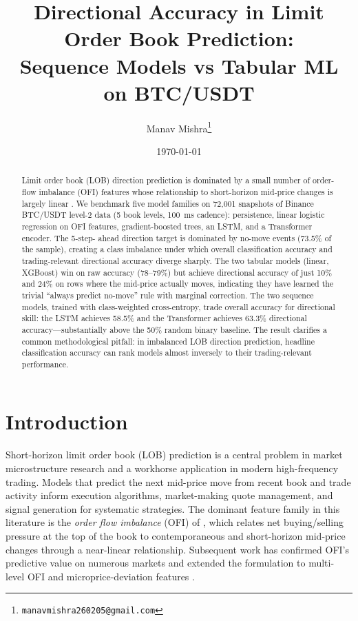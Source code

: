 \documentclass[11pt]{article}
\title{\bf Directional Accuracy in Limit Order Book Prediction: \\
Sequence Models vs Tabular ML on BTC/USDT}
\author[1]{Manav Mishra\thanks{\texttt{manavmishra260205@gmail.com}}}
\affil[1]{Vellore Institute of Technology, Vellore, India}
\date{\today}
\begin{document}
\maketitle

\begin{abstract}
Limit order book (LOB) direction prediction is dominated by a small
number of order-flow imbalance (OFI) features whose relationship to
short-horizon mid-price changes is largely linear
\citep{cont2014price}. We benchmark five model families on 72{,}001
snapshots of Binance BTC/USDT level-2 data (5 book levels, 100~ms
cadence): persistence, linear logistic regression on OFI features,
gradient-boosted trees, an LSTM, and a Transformer encoder. The 5-step-
ahead direction target is dominated by no-move events (73.5\% of the
sample), creating a class imbalance under which overall classification
accuracy and trading-relevant directional accuracy diverge sharply.
The two tabular models (linear, XGBoost) win on raw accuracy (78--79\%)
but achieve directional accuracy of just 10\% and 24\% on rows where
the mid-price actually moves, indicating they have learned the trivial
``always predict no-move'' rule with marginal correction. The two
sequence models, trained with class-weighted cross-entropy, trade
overall accuracy for directional skill: the LSTM achieves 58.5\% and
the Transformer achieves 63.3\% directional accuracy---substantially
above the 50\% random binary baseline. The result clarifies a common
methodological pitfall: in imbalanced LOB direction prediction,
headline classification accuracy can rank models almost inversely to
their trading-relevant performance.
\end{abstract}

\section{Introduction}
\label{sec:intro}

Short-horizon limit order book (LOB) prediction is a central problem
in market microstructure research and a workhorse application in
modern high-frequency trading. Models that predict the next mid-price
move from recent book and trade activity inform execution algorithms,
market-making quote management, and signal generation for systematic
strategies. The dominant feature family in this literature is the
\emph{order flow imbalance} (OFI) of \citet{cont2014price}, which
relates net buying/selling pressure at the top of the book to
contemporaneous and short-horizon mid-price changes through a
near-linear relationship. Subsequent work has confirmed OFI's
predictive value on numerous markets and extended the formulation to
multi-level OFI and microprice-deviation features
\citep{sirignano2019universal, briola2020deep}.
\end{document}
